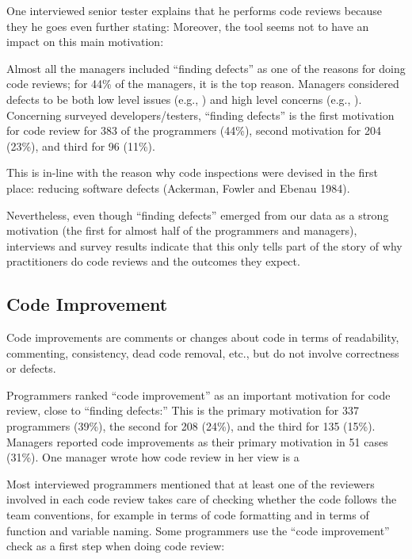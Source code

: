 One interviewed senior tester explains that he performs code reviews because
they  he goes even further stating:
 Moreover, the tool seems not to have an impact on this main
motivation: 

Almost all the managers included ``finding defects'' as one of the reasons for
doing code reviews; for 44\% of the managers, it is the top reason. Managers
considered defects to be both low level issues (e.g., ) and high level concerns (e.g., ). Concerning surveyed developers/testers, ``finding defects'' is the
first motivation for code review for 383 of the programmers (44\%), second
motivation for 204 (23\%), and third for 96 (11\%).

This is in-line with the reason why code inspections were devised in the first
place: reducing software defects (Ackerman, Fowler and Ebenau 1984).

Nevertheless, even though ``finding defects'' emerged from our data as a strong
motivation (the first for almost half of the programmers and managers),
interviews and survey results indicate that this only tells part of the story
of why practitioners do code reviews and the outcomes they expect.

\subsection{Code Improvement}

Code improvements are comments or changes about code in terms of readability,
commenting, consistency, dead code removal, etc., but do not involve
correctness or defects.

Programmers ranked ``code improvement'' as an important motivation for code
review, close to ``finding defects:'' This is the primary motivation for 337
programmers (39\%), the second for 208 (24\%), and the third for 135 (15\%).
Managers reported code improvements as their primary motivation in 51 cases
(31\%). One manager wrote how code review in her view is a

Most interviewed programmers mentioned that at least one of the reviewers
involved in each code review takes care of checking whether the code follows
the team conventions, for example in terms of code formatting and in terms of
function and variable naming. Some programmers use the ``code improvement''
check as a first step when doing code review: 

